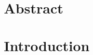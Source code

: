 \documentclass[12pt,letterpaper]{article}
\begin{document}
\vspace*{0.35in}

\begin{flushleft}
{\Large
\textbf{}
}
\newline
\\

\end{flushleft}

\section*{Abstract}

\linenumbers

\section{Introduction}
\end{document}
